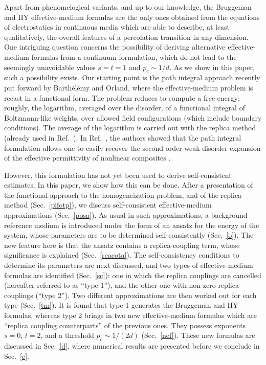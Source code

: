 Apart from phenomelogical variants, and up to our knowledge,
the Bruggeman and HY effective-medium formulas are
the only ones obtained from the equations of
electrostatics in continuous media which are able to describe, at least
qualitatively, the overall features of a percolation transition in any
dimension. One intriguing question concerns the possibility of deriving
alternative effective-medium formulas from a continuum formulation, which
do not lead to the seemingly unavoidable values $s=t=1$ and $p_c\sim
1/d$. As we show in this paper, such a possibility exists. Our starting
point is the path integral approach recently put forward by
Barth\'el\'emy and Orland\cite{BART98}, where the effective-medium
problem is recast in a functional form. The problem reduces to
compute a free-energy: roughly, the logarithm, averaged over the
disorder, of a functional integral of Boltzmann-like weights, over
allowed field configurations (which include boundary conditions). The
average of the logarithm is carried out with the replica method (already
used in Ref.\ \cite{STEP77}). In Ref.\ \cite{BART98}, the authors showed
that the path integral formulation 
allows one to easily recover the second-order
weak-disorder expansion of the effective permittivity of nonlinear
composites \cite{BLUM91}.

However, this formulation
has not yet been used to derive self-consistent estimates.
In this paper, we show how this can be done. 
After a presentation of the functional approach to the homogeneization 
problem, and of the replica method (Sec.\ \ref{pifotp}), 
we discuss self-consistent effective-medium 
approximations (Sec.\ \ref{posa}). As usual
in such approximations, a background reference medium is introduced under the
form of an ansatz for the energy of the system, 
whose parameters are to be
determined self-consistently (Sec.\ \ref{o}). 
The new feature here is that the ansatz
contains a replica-coupling term, whose significance is
explained (Sec.\ \ref{rcacota}). 
The self-consistency conditions to determine its parameters 
are next discussed,
and two types of effective-medium formulas are identified (Sec.\ \ref{sc}):
one in which the replica couplings are cancelled
(hereafter referred to as ``type 1''), 
and the other one with non-zero replica couplings (``type 2'').
Two different approximations are then worked out for each type 
(Sec.\ \ref{tm}). It is found that 
type 1 generates the Bruggeman and HY formulas, 
whereas type 2 brings in two new effective-medium formulas which 
are ``replica coupling counterparts'' of the previous ones. 
They possess exponents $s=0$, $t=2$, and 
a threshold $p_c\sim 1/(2d)$ (Sec.\ \ref{nef}).
These new formulas are discussed in Sec.\ \ref{d}, 
where numerical results are presented
before we conclude in Sec.\ \ref{c}.

